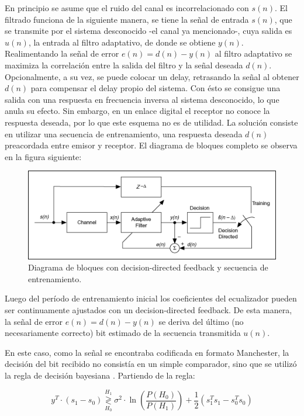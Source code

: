 \documentclass[main.tex]{subfiles}
\begin{document}
En principio se asume que el ruido del canal 
es incorrelacionado con $s(n)$.
El filtrado funciona de la siguiente manera, se tiene 
la señal de entrada $s(n)$, que se transmite por el sistema
desconocido -el canal ya mencionado-, cuya salida es 
$u(n)$, la entrada al filtro adaptativo, de donde se obtiene
$y(n)$. Realimentando la señal de error $e(n)=d(n)-y(n)$
al filtro adaptativo se maximiza la correlación entre la salida del 
filtro y la señal deseada $d(n)$.
Opcionalmente, a su vez, se puede colocar un delay, retrasando la señal al obtener 
$d(n)$ para compensar el delay propio del sistema.\newline
Con ésto se consigue una salida con una respuesta en frecuencia inversa
al sistema desconocido, lo que anula su efecto.\newline
Sin embargo, en un enlace digital el receptor no conoce la respuesta deseada, por lo que
este esquema no es de utilidad. La solución consiste en utilizar 
una secuencia de entrenamiento, una respuesta deseada $d(n)$ preacordada entre 
emisor y receptor.
El diagrama de bloques completo se observa en la figura siguiente:
\begin{figure}[H]
    \centering
    \includegraphics[scale=0.7]{imagenes/block-completo.png}
    \caption{Diagrama de bloques con decision-directed feedback y secuencia de entrenamiento.}
\end{figure}
Luego del período de entrenamiento inicial los coeficientes del ecualizador pueden ser
 continuamente ajustados con un decision-directed feedback. De esta manera, 
 la señal de error $e(n)=d(n)-y(n)$ se deriva del último (no necesariamente correcto) 
 bit estimado de la secuencia transmitida $u(n)$. 
 
 En este caso, como la se\~nal se encontraba codificada en formato Manchester, la decisi\'on
 del bit recibido no consist\'ia en un simple comparador, sino que se utiliz\'o la regla de decisi\'on
 bayesiana \cite{shanmugan}. Partiendo de la regla:
 
 \begin{equation}
 	y^{T} \cdot (s_1 - s_0) \underset{H_0}{\overset{H_1}{\gtrless}} 
 	\sigma^2 \cdot \ln{\left( \frac{P(H_0)}{P(H_1)} \right)}
 	+ \frac{1}{2} \left( s_1^T s_1 - s_0^T s_0\right)
 \end{equation}
 
\end{document}
